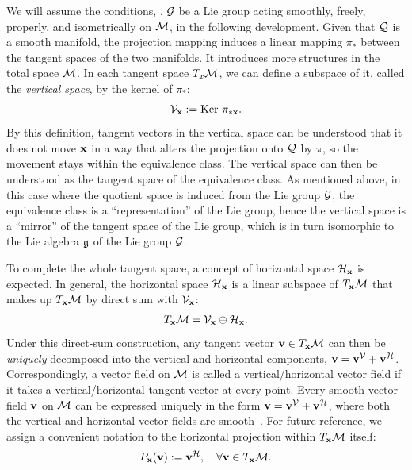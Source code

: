We will assume the conditions, \ie, $\mathcal{G}$ be a Lie group acting smoothly, freely, properly, and isometrically on $\mathcal{M}$, in the following development.
Given that $\mathcal{Q}$ is a smooth manifold, the projection mapping induces a linear mapping $\pi_*$ between the tangent spaces of the two manifolds. It introduces more structures in the total space $\mathcal{M}$.
In each tangent space $T_x \mathcal{M}$, we can define a subspace of it, called the \emph{vertical space}, by the kernel of $\pi_*$:
\begin{align}
    \mathcal{V}_{\mathbf{x}}:=\mathrm{Ker}\,\,\pi_{*\mathbf{x}}.
\end{align}
By this definition, tangent vectors in the vertical space can be understood that it does not move $\mathbf{x}$ in a way that alters the projection onto $\mathcal{Q}$ by $\pi$, so the movement stays within the equivalence class. The vertical space can then be understood as the tangent space of the equivalence class.
As mentioned above, in this case where the quotient space is induced from the Lie group $\mathcal{G}$, the equivalence class is a ``representation'' of the Lie group, hence the vertical space is a ``mirror'' of the tangent space of the Lie group, which is in turn isomorphic to the Lie algebra $\mathfrak{g}$ of the Lie group $\mathcal{G}$.

To complete the whole tangent space, a concept of horizontal space $\mathcal{H}_{\mathbf{x}}$ is expected. In general, the horizontal space $\mathcal{H}_{\mathbf{x}}$ is a linear subspace of $T_{\mathbf{x}} \mathcal{M}$ that makes up $T_{\mathbf{x}} \mathcal{M}$ by direct sum with $\mathcal{V}_{\mathbf{x}}$:
\begin{align}
    T_{\mathbf{x}} \mathcal{M} = \mathcal{V}_{\mathbf{x}} \oplus \mathcal{H}_{\mathbf{x}}. \label{eqn:h-v-direct-sum}
\end{align}
Under this direct-sum construction, any tangent vector $\mathbf{v} \in T_{\mathbf{x}} \mathcal{M}$ can then be \emph{uniquely} decomposed into the vertical and horizontal components, $\mathbf{v} = \mathbf{v}^{\mathcal{V}} + \mathbf{v}^{\mathcal{H}}$.
Correspondingly, a vector field on $\mathcal{M}$ is called a vertical/horizontal vector field if it takes a vertical/horizontal tangent vector at every point.
Every smooth vector field $\mathbf{v}$ on $\mathcal{M}$ can be expressed uniquely in the form $\mathbf{v}=\mathbf{v}^{\mathcal{V}} + \mathbf{v}^{\mathcal{H}}$, where %
both the vertical and horizontal vector fields are smooth~\citep[Prop.~2.25]{lee2018introduction}.
For future reference, we assign a convenient notation to the horizontal projection within $T_{\mathbf{x}} \mathcal{M}$ itself:
\begin{align}
    P_{\mathbf{x}}(\mathbf{v}) := \mathbf{v}^{\mathcal{H}}, \quad \forall \mathbf{v} \in T_{\mathbf{x}} \mathcal{M}.
\end{align}

